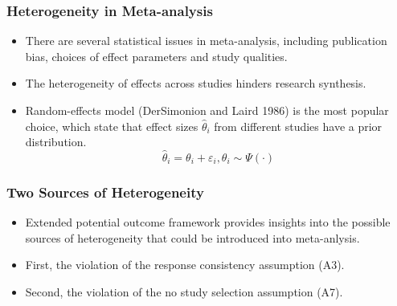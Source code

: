 \documentclass[xetex,mathserif,serif]{beamer}
\begin{document}
\begin{frame}
  \frametitle{Heterogeneity in Meta-analysis}
  \begin{itemize}
  \item There are several statistical issues in meta-analysis, including
    publication bias, choices of effect parameters and study qualities.
  \item The heterogeneity of effects across studies hinders research synthesis.
  \item Random-effects model (DerSimonion and Laird 1986) is the most popular
    choice, which state that effect sizes $\hat\theta_i$ from different studies
    have a prior distribution.
    \[\hat\theta_i=\theta_i+\varepsilon_i, \theta_i\sim \Psi(\cdot)\]
  \end{itemize}
\end{frame}

\begin{frame}
  \frametitle{Two Sources of Heterogeneity}
  \begin{itemize}
  \item Extended potential outcome framework provides insights into the possible
    sources of heterogeneity that could be introduced into meta-anlysis.
  \item First, the violation of the response consistency assumption (A3).
  \item Second, the violation of the no study selection assumption (A7).
  \end{itemize}
\end{frame}
\end{document}
